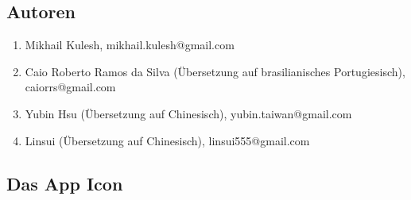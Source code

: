 \documentclass[DIV=calc, paper=a4, fontsize=11pt, twocolumn]{scrartcl}
\begin{document}
\subsection{Autoren}

\begin{enumerate}
\item Mikhail Kulesh,
mikhail.kulesh@gmail.com

\item Caio Roberto Ramos da Silva
(Übersetzung auf brasilianisches
Portugiesisch),
caiorrs@gmail.com

\item Yubin Hsu
(Übersetzung auf Chinesisch),
yubin.taiwan@gmail.com

\item Linsui
(Übersetzung auf Chinesisch),
linsui555@gmail.com
\end{enumerate}

\subsection{Das App Icon}
\end{document}
